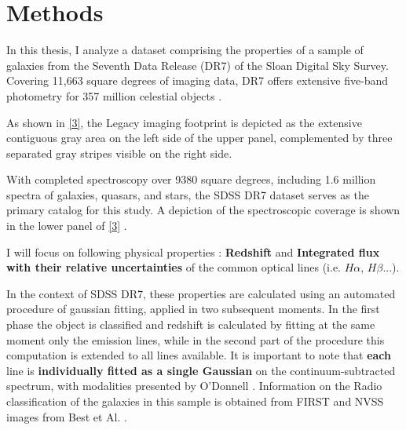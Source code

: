 \chapter{Methods}
In this thesis, I analyze a dataset comprising the properties of a sample of galaxies from the Seventh Data Release (DR7) of the Sloan Digital Sky Survey. Covering 11,663 square degrees of imaging data, DR7 offers extensive five-band photometry for 357 million celestial objects \cite{2009ApJS..182..543A,mpa-sdss-dr7}. 

As shown in  \autoref{3}, the Legacy imaging footprint is depicted as the extensive contiguous gray area on the left side of the upper panel, complemented by three separated gray stripes visible on the right side.

With completed spectroscopy over 9380 square degrees, including 1.6 million spectra of galaxies, quasars, and stars, the SDSS DR7 dataset serves as the primary catalog for this study. A depiction of the spectroscopic coverage is shown in the lower panel of \autoref{3} .
 
I will focus on following physical properties : \textbf{Redshift} and \textbf{Integrated flux with their relative uncertainties} of the common optical lines (i.e. $H\alpha$, $H\beta$...).

In the context of SDSS DR7, these properties are calculated using an automated procedure of gaussian fitting, applied in two subsequent moments. In the first phase the object is classified and redshift is calculated by fitting at the same moment only the emission lines, while in the second part of the procedure this computation is extended to all lines available. It is important to note that \textbf{each} line is \textbf{individually fitted as a single Gaussian} on the continuum-subtracted spectrum, with modalities presented by O'Donnell \cite{1994ApJ...422..158O}. Information on the Radio classification of the galaxies in this sample is obtained from FIRST and NVSS images from Best et Al. \cite{2005MNRAS.362....9B}.

